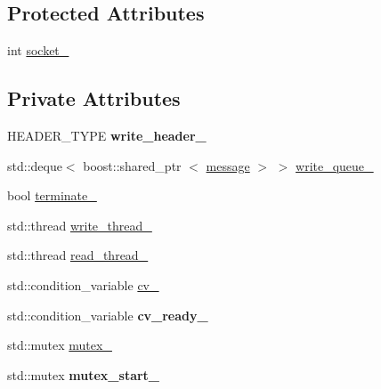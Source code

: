 \subsection*{\-Protected \-Attributes}
\begin{DoxyCompactItemize}
\item 
int \hyperlink{classgal_1_1network_1_1communicating_afe5f9de9e2535e261c78485dec4d9e82}{socket\-\_\-}
\end{DoxyCompactItemize}
\subsection*{\-Private \-Attributes}
\begin{DoxyCompactItemize}
\item 
\hypertarget{classgal_1_1network_1_1communicating_addb0099bce03feeb9ff20a5244976c54}{\-H\-E\-A\-D\-E\-R\-\_\-\-T\-Y\-P\-E {\bfseries write\-\_\-header\-\_\-}}\label{classgal_1_1network_1_1communicating_addb0099bce03feeb9ff20a5244976c54}

\item 
std\-::deque$<$ boost\-::shared\-\_\-ptr\*
$<$ \hyperlink{classgal_1_1network_1_1message}{message} $>$ $>$ \hyperlink{classgal_1_1network_1_1communicating_a5d0757e59bab953f76f65edfc1b3bd15}{write\-\_\-queue\-\_\-}
\item 
bool \hyperlink{classgal_1_1network_1_1communicating_a4dc031687aa84ce7e3cca5ce9839d5d7}{terminate\-\_\-}
\item 
std\-::thread \hyperlink{classgal_1_1network_1_1communicating_afc83d88ea30befb842e16a5cf7d5e936}{write\-\_\-thread\-\_\-}
\item 
std\-::thread \hyperlink{classgal_1_1network_1_1communicating_a2d94e9fcd2cd765768b354a87b726bf3}{read\-\_\-thread\-\_\-}
\item 
std\-::condition\-\_\-variable \hyperlink{classgal_1_1network_1_1communicating_aff2d38da260c4e5f9182eec6f8bc16bd}{cv\-\_\-}
\item 
\hypertarget{classgal_1_1network_1_1communicating_ac1027b607900f3d087baac99aba3507e}{std\-::condition\-\_\-variable {\bfseries cv\-\_\-ready\-\_\-}}\label{classgal_1_1network_1_1communicating_ac1027b607900f3d087baac99aba3507e}

\item 
std\-::mutex \hyperlink{classgal_1_1network_1_1communicating_a7afe6898e58ca9087f05124cf4d18b65}{mutex\-\_\-}
\item 
\hypertarget{classgal_1_1network_1_1communicating_a6f59c7c2c3034687f96369a9c76cc90b}{std\-::mutex {\bfseries mutex\-\_\-start\-\_\-}}\label{classgal_1_1network_1_1communicating_a6f59c7c2c3034687f96369a9c76cc90b}

\end{DoxyCompactItemize}
